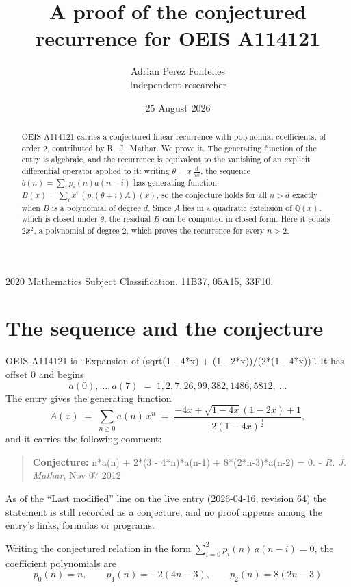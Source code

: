 \documentclass[11pt,a4paper]{article}
\title{A proof of the conjectured recurrence for OEIS A114121}
\author{Adrian Perez Fontelles\\ \small Independent researcher}
\date{25 August 2026}
\theoremstyle{plain}
\theoremstyle{definition}
\begin{document}
\maketitle

\begin{abstract}
OEIS A114121 carries a conjectured linear recurrence with polynomial coefficients, of
order 2, contributed by R.~J.~Mathar. We prove it. The generating function of the
entry is algebraic, and the recurrence is equivalent to the vanishing of an explicit
differential operator applied to it: writing $\theta=x\,\frac{d}{dx}$, the sequence
$b(n)=\sum_{i}p_{i}(n)a(n-i)$ has generating function
$B(x)=\sum_{i}x^{i}\,(p_{i}(\theta+i)A)(x)$, so the conjecture holds for all $n>d$ exactly
when $B$ is a polynomial of degree $d$. Since $A$ lies in a quadratic extension of
$\mathbb{Q}(x)$, which is closed under $\theta$, the residual $B$ can be computed in
closed form. Here it equals $2 x^{2}$, a polynomial of degree $2$, which proves
the recurrence for every $n>2$.
\end{abstract}

\noindent\small 2020 Mathematics Subject Classification. 11B37, 05A15, 33F10.\normalsize

\section{The sequence and the conjecture}

OEIS A114121 is ``Expansion of (sqrt(1 - 4*x) + (1 - 2*x))/(2*(1 - 4*x))''. It has offset $0$ and begins
\[
a(0),\dots,a(7)\;=\;1, 2, 7, 26, 99, 382, 1486, 5812,\ \dots
\]
The entry gives the generating function
\begin{equation}\label{eq:gf}
A(x)\;=\;\sum_{n\ge 0} a(n)\,x^{n}\;=\;\frac{- 4 x + \sqrt{1 - 4 x} \left(1 - 2 x\right) + 1}{2 \left(1 - 4 x\right)^{\frac{3}{2}}} ,
\end{equation}
and it carries the following comment:
\begin{quote}\small
\textbf{Conjecture:} n*a(n) + 2*(3 - 4*n)*a(n-1) + 8*(2*n-3)*a(n-2) = 0. - \emph{R. J. Mathar}, Nov 07 2012
\end{quote}
As of the ``Last modified'' line on the live entry (2026-04-16, revision 64) the
statement is still recorded as a conjecture, and no proof appears among the entry's links,
formulas or programs.

Writing the conjectured relation in the form $\sum_{i=0}^{2}p_{i}(n)\,a(n-i)=0$,
the coefficient polynomials are
\[
p_{0}(n)=n,\qquad p_{1}(n)=- 2 \left(4 n - 3\right),\qquad p_{2}(n)=8 \left(2 n - 3\right)
\]
\end{document}
